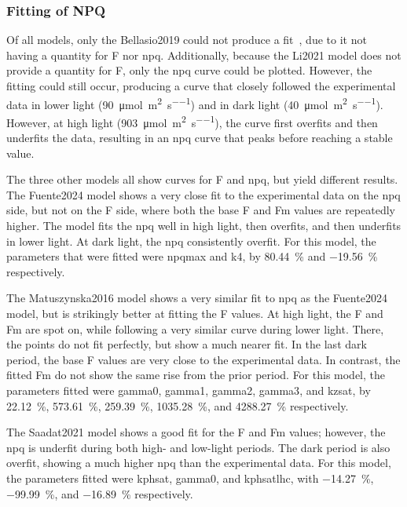\subsubsection{Fitting of NPQ}

Of all models, only the Bellasio2019 could not produce a fit~, due to it not having a quantity for \gls{F} nor \gls{npq}. Additionally, because the Li2021 model does not provide a quantity for \gls{F}, only the \gls{npq} curve could be plotted. However, the fitting could still occur, producing a curve that closely followed the experimental data in lower light (\qty{90}{\micro\mol\per\square\meter\per\second}) and in dark light (\qty{40}{\micro\mol\per\square\meter\per\second}). However, at high light (\qty{903}{\micro\mol\per\square\meter\per\second}), the curve first overfits and then underfits the data, resulting in an \gls{npq} curve that peaks before reaching a stable value.

The three other models all show curves for \gls{F} and \gls{npq}, but yield different results. The Fuente2024 model shows a very close fit to the experimental data on the \gls{npq} side, but not on the \gls{F} side, where both the base \gls{F} and \gls{Fm} values are repeatedly higher. The model fits the \gls{npq} well in high light, then overfits, and then underfits in lower light. At dark light, the \gls{npq} consistently overfit. For this model, the parameters that were fitted were \gls{npqmax} and \gls{k4}, by \qty{+80.44}{\percent} and \qty{-19.56}{\percent} respectively.

The Matuszynska2016 model shows a very similar fit to \gls{npq} as the Fuente2024 model, but is strikingly better at fitting the \gls{F} values. At high light, the \gls{F} and \gls{Fm} are spot on, while following a very similar curve during lower light. There, the points do not fit perfectly, but show a much nearer fit. In the last dark period, the base \gls{F} values are very close to the experimental data. In contrast, the fitted \gls{Fm} do not show the same rise from the prior period. For this model, the parameters fitted were \gls{gamma0}, \gls{gamma1}, \gls{gamma2}, \gls{gamma3}, and \gls{kzsat}, by \qty{22.12}{\percent}, \qty{573.61}{\percent}, \qty{259.39}{\percent}, \qty{1035.28}{\percent}, and \qty{4288.27}{\percent} respectively.

The Saadat2021 model shows a good fit for the \gls{F} and \gls{Fm} values; however, the \gls{npq} is underfit during both high- and low-light periods. The dark period is also overfit, showing a much higher \gls{npq} than the experimental data. For this model, the parameters fitted were \gls{kphsat}, \gls{gamma0}, and \gls{kphsatlhc}, with \qty{-14.27}{\percent}, \qty{-99.99}{\percent}, and \qty{-16.89}{\percent} respectively.

